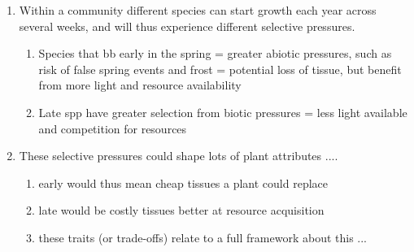 \documentclass{article}
\begin{document}
\begin{enumerate}
\item Within a community different species can start growth each year across several weeks, and will thus experience different selective pressures.  %
\begin{enumerate}
\item Species that bb early in the spring = greater abiotic pressures, such as risk of false spring events and frost = potential loss of tissue, but benefit from more light and resource availability
\item Late spp have greater selection from biotic pressures = less light available and competition for resources 
\end{enumerate}

\item These selective pressures could shape lots of plant attributes .... 
\begin{enumerate}
\item early would thus mean cheap tissues a plant could replace
\item late would be costly tissues better at resource acquisition
\item these traits (or trade-offs) relate to a full framework about this ... 
\end{enumerate}


\end{enumerate}
\end{document}
